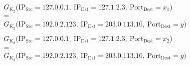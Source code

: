 \documentclass{standalone}
\begin{document}
\begin{minipage}{10cm}
	\[
		\begin{aligned}
			 & \begin{array}{c}
				   G_{K_2}\bigl(\text{IP}_{\text{Src}} = 127.0.0.1,\ \text{IP}_{\text{Dst}} = 127.1.2.3,\ \text{Port}_{\text{Dest}} = x_1 \bigr) \\[0.3em]
				   =                                                                                                                             \\[0.3em]
				   G_{K_2}\bigl(\text{IP}_{\text{Src}} = 192.0.2.123,\ \text{IP}_{\text{Dst}} = 203.0.113.10,\ \text{Port}_{\text{Dest}} = y \bigr)
			   \end{array}
			\\[1cm]
			 & \begin{array}{c}
				   G_{K_2}\bigl(\text{IP}_{\text{Src}} = 127.0.0.1,\ \text{IP}_{\text{Dst}} = 127.1.2.3,\ \text{Port}_{\text{Dest}} = x_2 \bigr) \\[0.3em]
				   =                                                                                                                             \\[0.3em]
				   G_{K_2}\bigl(\text{IP}_{\text{Src}} = 192.0.2.123,\ \text{IP}_{\text{Dst}} = 203.0.113.10,\ \text{Port}_{\text{Dest}} = y \bigr)
			   \end{array}
		\end{aligned}
	\]
\end{minipage}
\end{document}
